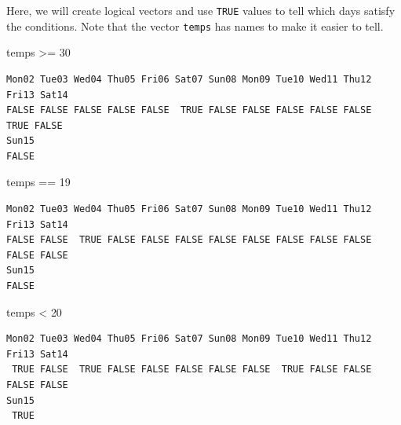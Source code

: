 \documentclass[
  letterpaper,
  DIV=11,
  numbers=noendperiod]{scrreprt}
\newenvironment{Shaded}{\begin{snugshade}}{\end{snugshade}}
\newcommand{\DecValTok}[1]{\textcolor[rgb]{0.68,0.00,0.00}{#1}}
\newcommand{\NormalTok}[1]{\textcolor[rgb]{0.00,0.23,0.31}{#1}}
\newcommand{\SpecialCharTok}[1]{\textcolor[rgb]{0.37,0.37,0.37}{#1}}
\begin{document}
\begin{tcolorbox}[enhanced jigsaw, colbacktitle=quarto-callout-tip-color!10!white, opacitybacktitle=0.6, breakable, left=2mm, leftrule=.75mm, toprule=.15mm, toptitle=1mm, bottomtitle=1mm, colframe=quarto-callout-tip-color-frame, opacityback=0, coltitle=black, arc=.35mm, titlerule=0mm, colback=white, bottomrule=.15mm, title=\textcolor{quarto-callout-tip-color}{\faLightbulb}\hspace{0.5em}{Answer}, rightrule=.15mm]

Here, we will create logical vectors and use \texttt{TRUE} values to
tell which days satisfy the conditions. Note that the vector
\texttt{temps} has names to make it easier to tell.

\begin{Shaded}
\begin{Highlighting}[]
\NormalTok{temps }\SpecialCharTok{\textgreater{}=} \DecValTok{30}
\end{Highlighting}
\end{Shaded}

\begin{verbatim}
Mon02 Tue03 Wed04 Thu05 Fri06 Sat07 Sun08 Mon09 Tue10 Wed11 Thu12 Fri13 Sat14 
FALSE FALSE FALSE FALSE FALSE  TRUE FALSE FALSE FALSE FALSE FALSE  TRUE FALSE 
Sun15 
FALSE 
\end{verbatim}

\begin{Shaded}
\begin{Highlighting}[]
\NormalTok{temps }\SpecialCharTok{==} \DecValTok{19}
\end{Highlighting}
\end{Shaded}

\begin{verbatim}
Mon02 Tue03 Wed04 Thu05 Fri06 Sat07 Sun08 Mon09 Tue10 Wed11 Thu12 Fri13 Sat14 
FALSE FALSE  TRUE FALSE FALSE FALSE FALSE FALSE FALSE FALSE FALSE FALSE FALSE 
Sun15 
FALSE 
\end{verbatim}

\begin{Shaded}
\begin{Highlighting}[]
\NormalTok{temps }\SpecialCharTok{\textless{}} \DecValTok{20}
\end{Highlighting}
\end{Shaded}

\begin{verbatim}
Mon02 Tue03 Wed04 Thu05 Fri06 Sat07 Sun08 Mon09 Tue10 Wed11 Thu12 Fri13 Sat14 
 TRUE FALSE  TRUE FALSE FALSE FALSE FALSE FALSE  TRUE FALSE FALSE FALSE FALSE 
Sun15 
 TRUE 
\end{verbatim}


\end{tcolorbox}
\end{document}
